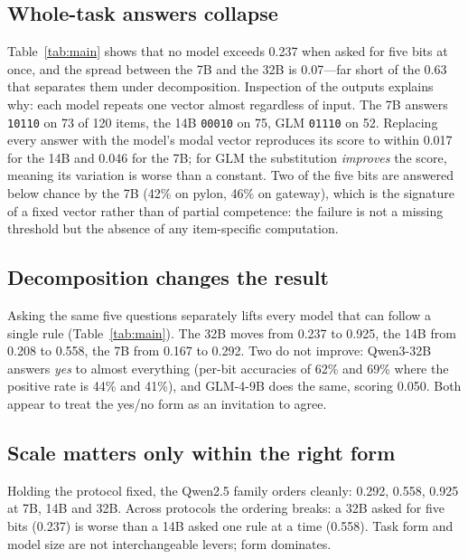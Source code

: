 \documentclass[journal]{IEEEtran}
\begin{document}
\subsection{Whole-task answers collapse}

Table~\ref{tab:main} shows that no model exceeds 0.237 when asked for five bits at once, and the
spread between the 7B and the 32B is 0.07---far short of the 0.63 that separates them under
decomposition. Inspection of the outputs explains why: each model repeats one vector
almost regardless of input. The 7B answers \texttt{10110} on 73 of 120 items, the 14B
\texttt{00010} on 75, GLM \texttt{01110} on 52. Replacing every answer with the model's modal
vector reproduces its score to within 0.017 for the 14B and 0.046 for the 7B; for GLM the
substitution \emph{improves} the score, meaning its variation is worse than a constant.
Two of the five bits are answered below chance by the 7B (42\% on pylon, 46\% on gateway), which
is the signature of a fixed vector rather than of partial competence: the failure is not a
missing threshold but the absence of any item-specific computation.

\subsection{Decomposition changes the result}

Asking the same five questions separately lifts every model that can follow a single rule
(Table~\ref{tab:main}). The 32B moves from 0.237 to 0.925, the 14B from 0.208 to 0.558, the 7B
from 0.167 to 0.292. Two do not improve: Qwen3-32B answers \emph{yes} to almost everything
(per-bit accuracies of 62\% and 69\% where the positive rate is 44\% and 41\%), and GLM-4-9B
does the same, scoring 0.050. Both appear to treat the yes/no form as an invitation to agree.

\subsection{Scale matters only within the right form}

Holding the protocol fixed, the Qwen2.5 family orders cleanly: 0.292, 0.558, 0.925 at 7B, 14B
and 32B. Across protocols the ordering breaks: a 32B asked for five bits (0.237) is worse than
a 14B asked one rule at a time (0.558). Task form and model size are not interchangeable
levers; form dominates.
\end{document}
